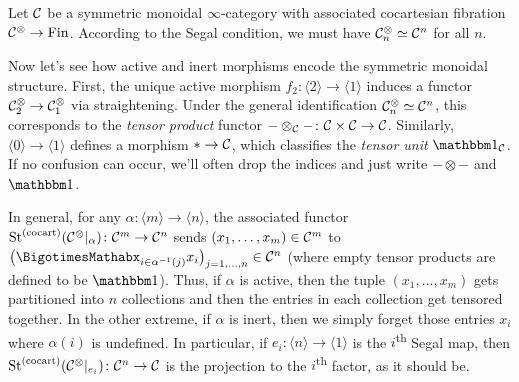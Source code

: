 \begin{numpar}\label{par:UnravellingSymmetricMonoidal}
	Let $\mathcal{C}$ be a symmetric monoidal $\infty$-category with associated cocartesian fibration $\mathcal{C}^\otimes\rightarrow \mathrm{Fin}$. According to the Segal condition, we must have $\mathcal{C}^\otimes_n\simeq \mathcal{C}^n$ for all $n$.
	
	Now let's see how active and inert morphisms encode the symmetric monoidal structure. First, the unique active morphism $f_2\colon \langle2\rangle \rightarrow \langle 1\rangle$ induces a functor $\mathcal{C}_2^\otimes\rightarrow \mathcal{C}_1^\otimes$ via straightening. Under the general identification $\mathcal{C}_n^\otimes\simeq \mathcal{C}^n$, this corresponds to the \emph{tensor product} functor $-\otimes_{\mathcal{C}} -\colon \mathcal{C}\times \mathcal{C}\rightarrow \mathcal{C}$. Similarly, $\langle 0\rangle \rightarrow \langle 1\rangle$ defines a morphism $*\rightarrow \mathcal{C}$, which classifies the \emph{tensor unit} $\IUnit_\Cc$. If no confusion can occur, we'll often drop the indices and just write $-\otimes -$ and $\IUnit$.
	
	In general, for any $\alpha\colon \langle m\rangle\rightarrow \langle n\rangle$, the associated functor $\operatorname{St}^{(\mathrm{cocart})}(\mathcal{C}^\otimes|_\alpha)\colon \mathcal{C}^m\rightarrow \mathcal{C}^n$ sends $(x_1,\dotsc,x_m)\in \mathcal{C}^m$ to $\bigl(\bigotimes_{i\in\alpha^{-1}(j)}x_i\bigr)_{j=1,\dotsc,n}\in\Cc^n$ (where empty tensor products are defined to be $\IUnit$). Thus, if $\alpha$ is active, then the tuple $(x_1,\dotsc,x_m)$ gets partitioned into $n$ collections and then the entries in each collection get tensored together. In the other extreme, if $\alpha$ is inert, then we simply forget those entries $x_i$ where $\alpha(i)$ is undefined. In particular, if $e_i\colon \langle n\rangle\rightarrow \langle 1\rangle$ is the $i$\textsuperscript{th} Segal map, then $\operatorname{St}^{(\mathrm{cocart})}(\mathcal{C}^\otimes|_{e_i})\colon \mathcal{C}^n\rightarrow \mathcal{C}$ is the projection to the $i$\textsuperscript{th} factor, as it should be.
\end{numpar}

